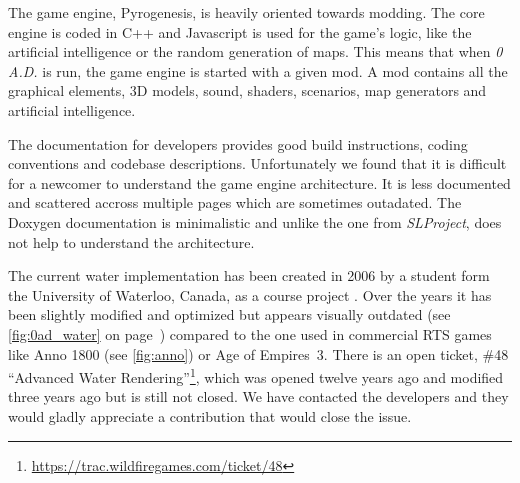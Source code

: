 The game engine, Pyrogenesis, is heavily oriented towards modding. The core
engine is coded in C++ and Javascript is used for the game's logic, like the
artificial intelligence or the random generation of maps. This means that when
\textit{0 A.D.} is run, the game engine is started with a given mod. A mod
contains all the graphical elements, 3D models, sound, shaders, scenarios, map
generators and artificial intelligence.

The documentation for developers provides good build instructions, coding
conventions and codebase descriptions. Unfortunately we found that it is
difficult for a newcomer to understand the game engine architecture. It is less
documented and scattered accross multiple pages which are sometimes outadated.
The Doxygen documentation is minimalistic and unlike the one from
\textit{SLProject}, does not help to understand the architecture.

The current water implementation has been created in 2006 by a student form the
University of Waterloo, Canada, as a course project \autocite{zaharia2006cs}.
Over the years it has been slightly modified and optimized but appears visually
outdated (see \autoref{fig:0ad_water} on page~\pageref{fig:0ad_water}) compared
to the one used in commercial RTS games like Anno 1800 (see
\autoref{fig:anno}) or Age of Empires~3. There is an open ticket, \#48
``Advanced Water
Rendering''\footnote{\url{https://trac.wildfiregames.com/ticket/48}}, which was
opened twelve years ago and modified three years ago but is still not closed.
We have contacted the developers and they would gladly appreciate a contribution
that would close the issue.

